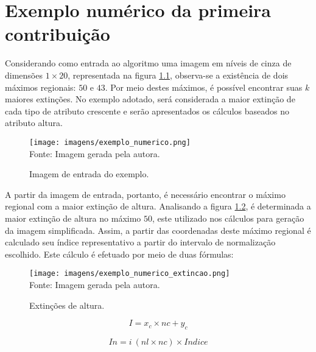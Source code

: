 \appendix

\chapter{Exemplo num{\'e}rico da primeira contribui{\c{c}}{\~a}o}

Considerando como entrada ao algoritmo uma imagem em n{\'i}veis de cinza de dimens{\~o}es $1 \times 20$, representada na figura \ref{fig:entrada_exemplo_numerico}, observa-se a exist{\^e}ncia de dois m{\'a}ximos regionais: $50$ e $43$. Por meio destes m{\'a}ximos, {\'e} poss{\'i}vel encontrar suas $k$ maiores extin{\c c}{\~o}es. No exemplo adotado, ser{\'a} considerada a maior extin{\c c}{\~a}o de cada tipo de atributo crescente e ser{\~a}o apresentados os c{\'a}lculos baseados no atributo altura.

\begin{figure}[ht]
	\centering
	\caption{Imagem de entrada do exemplo.}
	\texttt{[image: imagens/exemplo\_numerico.png]} \\
	Fonte: Imagem gerada pela autora.
    \label{fig:entrada_exemplo_numerico}
\end{figure}

A partir da imagem de entrada, portanto, {\'e} necess{\'a}rio encontrar o m{\'a}ximo regional com a maior extin{\c c}{\~a}o de altura. Analisando a figura \ref{fig:entrada_exemplo_numerico_extincao}, {\'e} determinada a maior extin{\c c}{\~a}o de altura no m{\'a}ximo $50$, este utilizado nos c{\'a}lculos para gera{\c c}{\~a}o da imagem simplificada. Assim, a partir das coordenadas deste m{\'a}ximo regional {\'e} calculado seu {\'i}ndice representativo a partir do intervalo de normaliza{\c c}{\~a}o escolhido. Este c{\'a}lculo {\'e} efetuado por meio de duas f{\'o}rmulas:

\begin{figure}[ht]
	\centering
	\caption{Extin{\c c}{\~o}es de altura.}
	\texttt{[image: imagens/exemplo\_numerico\_extincao.png]} \\
	Fonte: Imagem gerada pela autora.
    \label{fig:entrada_exemplo_numerico_extincao}
\end{figure}

\begin{equation}
	I = x_{c} \times nc + y_{c}
\end{equation}

\begin{equation}
	In = i \ (nl \times nc) \times Indice
\end{equation}

